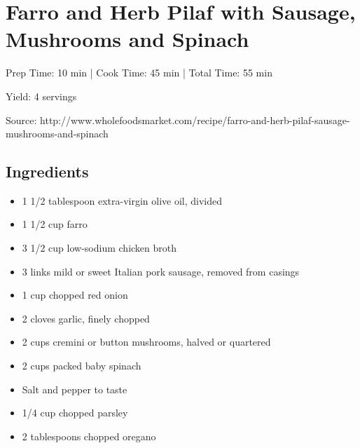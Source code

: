 \section{Farro and Herb Pilaf with Sausage, Mushrooms and Spinach}

\begin{center}
Prep Time: 10 min | 
Cook Time: 45 min |
Total Time: 55 min

\noindent Yield: 4 servings

\vspace{1em}

Source: http://www.wholefoodsmarket.com/recipe/farro-and-herb-pilaf-sausage-mushrooms-and-spinach
\end{center}

\subsection{Ingredients}
\begin{multicols}{2}
\begin{itemize}
    \item 1 1/2 tablespoon extra-virgin olive oil, divided
    \item 1 1/2 cup farro
    \item 3 1/2 cup low-sodium chicken broth
    \item 3 links mild or sweet Italian pork sausage, removed from casings
    \item 1 cup chopped red onion
    \item 2 cloves garlic, finely chopped
    \item 2 cups cremini or button mushrooms, halved or quartered
    \item 2 cups packed baby spinach
    \item Salt and pepper to taste
    \item 1/4 cup chopped parsley
    \item 2 tablespoons chopped oregano
\end{itemize}
\end{multicols}

